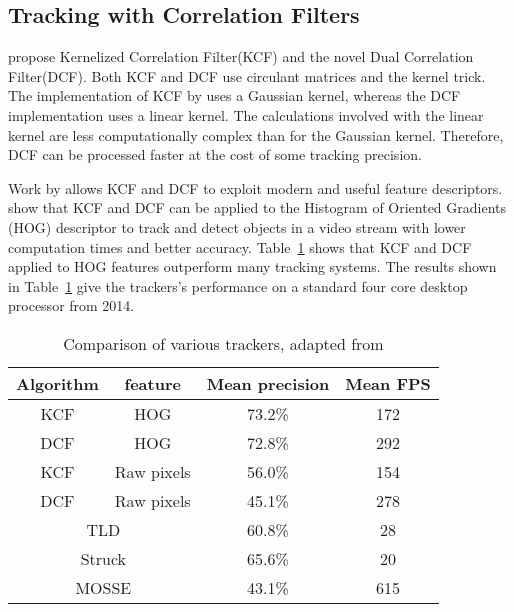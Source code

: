 \subsection{Tracking with Correlation Filters}
\citet{Enriques2014} propose Kernelized Correlation Filter(KCF) and the novel Dual Correlation Filter(DCF).
Both KCF and DCF use circulant matrices and the kernel trick.
The implementation of KCF by \citeauthor{Enriques2014} uses a Gaussian kernel, whereas the DCF implementation uses a linear kernel.
The calculations involved with the linear kernel are less computationally complex than for the Gaussian kernel. 
Therefore, DCF can be processed faster at the cost of some tracking precision.

Work by \citeauthor{multichannelCorrFilters} \cite{multichannelCorrFilters} allows KCF and DCF to exploit modern and useful feature descriptors.
\citeauthor{Enriques2014} show that KCF and DCF can be applied to the Histogram of Oriented Gradients (HOG) descriptor to track and detect objects in a video stream with lower computation times and better accuracy.
Table~\ref{tab:trackers} shows that KCF and DCF applied to HOG features outperform many tracking systems.
The results shown in Table~\ref{tab:trackers} give the trackers's performance on a standard four core desktop processor from 2014.

\begin{table}
  \centering
  \begin{tabular}[t]{cccc}
    \toprule
    Algorithm & feature & Mean precision & Mean FPS \\
    \midrule
    KCF       & HOG     & 73.2\%         & 172      \\
    \hline
    DCF       & HOG     & 72.8\%         & 292      \\
    \hline
    KCF       & Raw pixels & 56.0\%      & 154      \\
    \hline
    DCF       & Raw pixels & 45.1\%      & 278      \\
    \midrule
    \midrule
    \multicolumn{2}{c}{TLD}   & 60.8\%      &  28      \\
    \hline
    \multicolumn{2}{c}{Struck\cite{struck}}& 65.6\%     &  20     \\
    \hline
    \multicolumn{2}{c}{MOSSE\cite{mosse}}& 43.1\%      &  615     \\
    \bottomrule
  \end{tabular}
  \caption{Comparison of various trackers, adapted from \cite{Enriques2014}}
  \label{tab:trackers}
\end{table}

